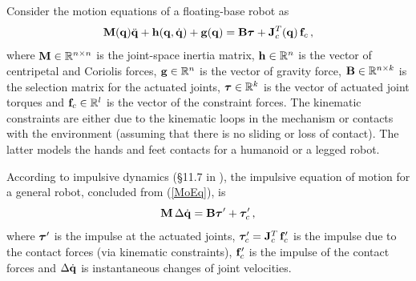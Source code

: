 Consider the motion equations of a floating-base robot as
%
\begin{equation}
  \mathbf{M}(\mathbf{q}) \ddot{\mathbf{q}} + \mathbf{h}(\mathbf{q},\dot{\mathbf{q}}) + \mathbf{g}(\mathbf{q}) = \mathbf{B} \boldsymbol{\tau} +
  \mathbf{J}^T_c(\mathbf{q}) \, {\mathbf{f}}_c \, ,
  \label{MoEq}
\end{equation}
%
where $\mathbf{M} \in \mathbb{R}^{n \times n}$ is the joint-space inertia matrix, $\mathbf{h} \in
\mathbb{R}^n$ is the vector of centripetal and Coriolis forces, $\mathbf{g} \in \mathbb{R}^n$ is the
vector of gravity force, $\mathbf{B} \in \mathbb{R}^{n \times k}$ is the selection matrix for
the actuated joints, $\boldsymbol{\tau} \in \mathbb{R}^k$ is the vector of actuated joint torques
and ${\mathbf{f}}_c \in \mathbb{R}^l$ is the vector of the constraint forces.  The kinematic
constraints are either due to the kinematic loops in the mechanism or contacts
with the environment (assuming that there is no sliding or loss of contact).
The latter models the hands and feet contacts for a humanoid or a legged
robot.

According to impulsive dynamics (\S 11.7 in \cite{Featherstone08}), the
impulsive equation of motion for a general robot, concluded from (\ref{MoEq}),
is
%
\begin{equation}
  \mathbf{M} \, \Delta \dot{\mathbf{q}} = \mathbf{B} \boldsymbol{\tau}' + \boldsymbol{\tau}'_c \, ,
  \label{MoEqImpulse}
\end{equation}
%
where $\boldsymbol{\tau}'$ is the impulse at the actuated joints, $\boldsymbol{\tau}'_c = \mathbf{J}_c^T \,
\mathbf{f}'_c$ is the impulse due to the contact forces (via kinematic constraints),
$\mathbf{f}'_c$ is the impulse of the contact forces and $\Delta \dot{\mathbf{q}}$ is
instantaneous changes of joint velocities.

